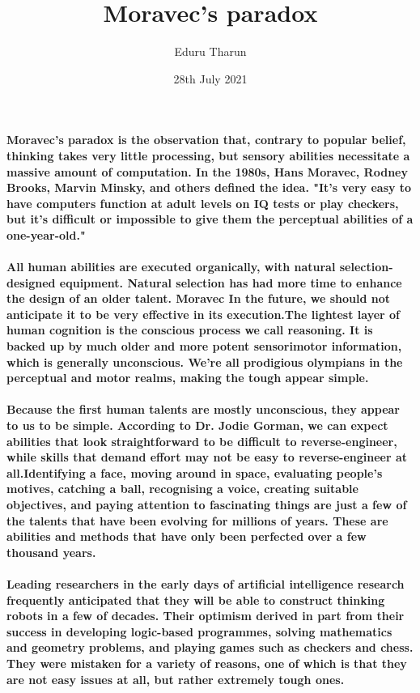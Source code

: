 \documentclass{article}
\title{\vspace{-2cm}Moravec's paradox}
\author{Eduru Tharun }
\date{ 28th July 2021}
\begin{document}
	
	\maketitle 
	\paragraph{ Moravec's paradox is the observation that, contrary to popular belief, thinking takes very little processing, but sensory abilities necessitate a massive amount of computation. In the 1980s, Hans Moravec, Rodney Brooks, Marvin Minsky, and others defined the idea. "It's very easy to have computers function at adult levels on IQ tests or play checkers, but it's difficult or impossible to give them the perceptual abilities of a one-year-old."}
	
	\paragraph{ All human abilities are executed organically, with natural selection-designed equipment. Natural selection has had more time to enhance the design of an older talent. Moravec In the future, we should not anticipate it to be very effective in its execution.The lightest layer of human cognition is the conscious process we call reasoning. It is backed up by much older and more potent sensorimotor information, which is generally unconscious. We're all prodigious olympians in the perceptual and motor realms, making the tough appear simple.}
	
	\paragraph{Because the first human talents are mostly unconscious, they appear to us to be simple. According to Dr. Jodie Gorman, we can expect abilities that look straightforward to be difficult to reverse-engineer, while skills that demand effort may not be easy to reverse-engineer at all.Identifying a face, moving around in space, evaluating people's motives, catching a ball, recognising a voice, creating suitable objectives, and paying attention to fascinating things are just a few of the talents that have been evolving for millions of years. These are abilities and methods that have only been perfected over a few thousand years.}
	
	\paragraph{Leading researchers in the early days of artificial intelligence research frequently anticipated that they will be able to construct thinking robots in a few of decades. Their optimism derived in part from their success in developing logic-based programmes, solving mathematics and geometry problems, and playing games such as checkers and chess. They were mistaken for a variety of reasons, one of which is that they are not easy issues at all, but rather extremely tough ones.}
	
\end{document}
